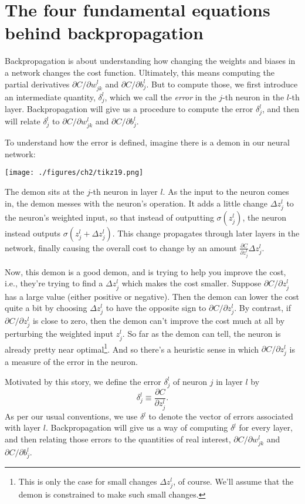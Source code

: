 \documentclass[a4paper,twoside,10pt]{book}
\begin{document}
\section{The four fundamental equations behind backpropagation}
\label{sec:2.4}
Backpropagation is about understanding how changing the weights and biases in a network changes the cost function. Ultimately, this means computing the partial derivatives $\partial{}C/\partial{}w^l_{jk}$ and $\partial{}C/\partial{}b^l_j$. But to compute those, we first introduce an intermediate quantity, $\delta^l_j$, which we call the \textit{error} in the $j$-th neuron in the $l$-th layer. Backpropagation will give us a procedure to compute the error $\delta^l_j$, and then will relate $\delta^l_j$ to $\partial{}C/\partial{}w^l_{jk}$ and $\partial{}C/\partial{}b^l_j$.

To understand how the error is defined, imagine there is a demon in our neural network:

\begin{center}
	\texttt{[image: ./figures/ch2/tikz19.png]}
\end{center}
The demon sits at the $j$-th neuron in layer $l$. As the input to the neuron comes in, the demon messes with the neuron's operation. It adds a little change $\Delta{}z^l_j$ to the neuron's weighted input, so that instead of outputting $\sigma(z^l_j)$, the neuron instead outputs $\sigma(z^l_j+\Delta{}z^l_j)$. This change propagates through later layers in the network, finally causing the overall cost to change by an amount $\frac{\partial{}C}{\partial{}z^l_j}\Delta{}z^l_j$.

Now, this demon is a good demon, and is trying to help you improve the cost, i.e., they're trying to find a $\Delta{}z^l_j$ which makes the cost smaller. Suppose $\partial{}C/\partial{}z^l_j$ has a large value (either positive or negative). Then the demon can lower the cost quite a bit by choosing $\Delta{}z^l_j$ to have the opposite sign to $\partial{}C/\partial{}z^l_j$. By contrast, if $\partial{}C/\partial{}z^l_j$ is close to zero, then the demon can't improve the cost much at all by perturbing the weighted input $z^l_j$. So far as the demon can tell, the neuron is already pretty near optimal\footnote{This is only the case for small changes $\Delta{}z^l_j$, of course. We'll assume that the demon is constrained to make such small changes.}. And so there's a heuristic sense in which $\partial{}C/\partial{}z^l_j$ is a measure of the error in the neuron.

Motivated by this story, we define the error $\delta^l_j$ of neuron $j$ in layer $l$ by
\begin{equation}
	\delta^l_j\equiv\frac{\partial{}C}{\partial{}z^l_j}.\tag{29}\label{eq:29}
\end{equation}
As per our usual conventions, we use $\delta{}^l$ to denote the vector of errors associated with layer $l$. Backpropagation will give us a way of computing $\delta{}^l$ for every layer, and then relating those errors to the quantities of real interest, $\partial{}C/\partial{}w^l_{jk}$ and $\partial{}C/\partial{}b^l_j$.
\end{document}
